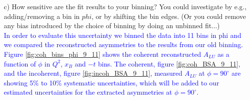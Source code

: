   c) How sensitive are the fit results to your binning? You could investigate 
by e.g., adding/removing a bin in $phi$, or  by shifting the bin edges. (Or you 
could remove any bias introduced by the choice of binning by doing an unbinned 
fit...)\\
\textcolor{blue}{ In order to evaluate this uncertainty we binned the data into 
   11 bins in phi and we compared the reconstructed asymmetries to the results 
from our old binning.  Figure \ref{fig:coh_bins_phi_9_11} shows the coherent 
reconstructed $A_{LU}$ as a function of $\phi$ in $Q^{2}$, $x_B$ and $-t$ bins.  
The coherent, figure \ref{fig:coh_BSA_9_11}, and the incoherent, figure 
\ref{fig:incoh_BSA_9_11}, measured $A_{LU}$ at $\phi = 90 ^{\circ}$ are showing 
5$\%$ to 10$\%$ systematic uncertainties, which will be added to our estimated 
uncertainties for the extracted asymmetries at $\phi = 90^{\circ}$.  }\\
